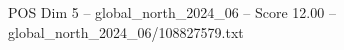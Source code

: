 \begin{textsample}{POS Dim 5 – global\_north\_2024\_06 – Score 12.00 – global\_north\_2024\_06/108827579.txt}
\end{textsample}
